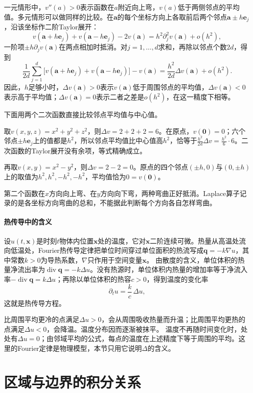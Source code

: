一元情形中，$v''(a)>0$表示函数在$a$附近向上弯，$v(a)$低于两侧邻点的平均值。多元情形可以做同样的比较。在$\bm a$的每个坐标方向上各取前后两个邻点$\bm a\pm h\bm e_j$，沿该坐标作二阶Taylor展开：
\[
 v(\bm a+h\bm e_j)+v(\bm a-h\bm e_j)-2v(\bm a)=h^2\partial_j^2v(\bm a)+o(h^2),
\]
一阶项$\pm h\partial_jv(\bm a)$在两点相加时抵消。对$j=1,\ldots,d$求和，再除以邻点个数$2d$，得到
\[
 \frac1{2d}\sum_{j=1}^d\bigl[v(\bm a+h\bm e_j)+v(\bm a-h\bm e_j)\bigr]-v(\bm a)
 =\frac{h^2}{2d}\Delta v(\bm a)+o(h^2).
\]
因此，$h$足够小时，$\Delta v(\bm a)>0$表示$v(\bm a)$低于周围邻点的平均值，$\Delta v(\bm a)<0$表示高于平均值；$\Delta v(\bm a)=0$表示二者之差是$o(h^2)$，在这一精度下相等。

下面用两个二次函数直接比较邻点平均值与中心值。
\begin{example}[二次函数的邻点平均]
取$v(x,y,z)=x^2+y^2+z^2$，则$\Delta v=2+2+2=6$。在原点，$v(\bm0)=0$；六个邻点$\pm h\bm e_j$上的值都是$h^2$，所以邻点平均值比中心值高$h^2$，恰等于$\frac{h^2}{2d}\Delta v=\frac{h^2}6\cdot6$。二次函数的Taylor展开没有余项，等式精确成立。

再取$v(x,y)=x^2-y^2$，则$\Delta v=2-2=0$。原点的四个邻点$(\pm h,0)$与$(0,\pm h)$上的取值为$h^2,h^2,-h^2,-h^2$，平均值恰为$0=v(\bm0)$。
\end{example}
第二个函数在$x$方向向上弯、在$y$方向向下弯，两种弯曲正好抵消。Laplace算子记录的是各坐标方向弯曲的总和，不能据此判断每个方向各自怎样弯曲。

\paragraph{热传导中的含义}

设$u(t,\bm x)$是时刻$t$物体内位置$\bm x$处的温度，它对$\bm x$二阶连续可微。热量从高温处流向低温处，Fourier热传导定律把单位时间穿过单位面积的热流写成$\bm q=-k\nabla u$，其中常数$k>0$为导热系数，$\nabla$只作用于空间变量$\bm x$。
由散度的含义，单位体积的热量净流出率为$\operatorname{div}\bm q=-k\Delta u$。没有热源时，单位体积内热量的增加率等于净流入率$-\operatorname{div}\bm q=k\Delta u$；再除以单位体积的热容$c>0$，得到温度的变化率
\[
 \partial_tu=\frac kc\,\Delta u,
\]
这就是热传导方程。

比周围平均更冷的点满足$\Delta u>0$，会从周围吸收热量而升温；比周围平均更热的点满足$\Delta u<0$，会降温。温度分布因而逐渐被抹平。
温度不再随时间变化时，处处有$\Delta u=0$；由邻域平均的公式，每点的温度在上述精度下等于周围的平均。这里的Fourier定律是物理模型，本节只用它说明$\Delta$的含义。

\section{区域与边界的积分关系}
\label{sec:multivariable-boundary-relations}


